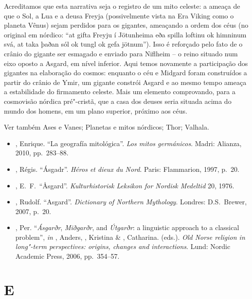 Acreditamos que esta narrativa seja o registro de um mito celeste: a
ameaça de que o Sol, a Lua e a deusa Freyja (possivelmente vista na Era
Viking como o planeta Vênus) sejam perdidos para os gigantes, ameaçando
a ordem dos céus (no original em nórdico: ``at gifta Freyju í Jötunheima
eða spilla loftinu ok himninum svá, at taka þaðan sól ok tungl ok gefa
jötnum''). Isso é reforçado pelo fato de o crânio do gigante ser
esmagado e enviado para Niflheim -- o reino situado num eixo oposto a
Asgard, em nível inferior. Aqui temos novamente a participação dos
gigantes na elaboração do cosmos: enquanto o céu e Midgard foram
construídos a partir do crânio de Ymir, um gigante constrói Asgard e ao
mesmo tempo ameaça a estabilidade do firmamento celeste. Mais um
elemento comprovando, para a cosmovisão nórdica pré"-cristã, que a casa
dos deuses seria situada acima do mundo dos homens, em um plano
superior, próximo aos céus.

Ver também Ases e Vanes; Planetas e mitos nórdicos; Thor; Valhala.



\begin{itemize}\footnotesize
\item
  , Enrique. ``La geografía mitológica''. \emph{Los mitos
  germánicos}. Madri: Alianza, 2010, pp.~283--88.
\item
  , Régis. ``Ásgadr''. \emph{Héros et dieux du Nord}. Paris:
  Flammarion, 1997, p.~20.
\item
  , E.~F.~``Åsgard''. \emph{Kulturhistorisk Leksikon for Nordisk
  Medeltid} 20, 1976.
\item
  , Rudolf. ``Asgard''. \emph{Dictionary of Northern Mythology}.
  Londres: D.S.~Brewer, 2007, p.~20.
\item
  , Per. ``\emph{Ásgarðr}, \emph{Miðgarðr}, and \emph{Útgarðr}: a linguistic approach
  to a classical problem'', \emph{in}  , Anders, , Kristina \&
  , Catharina. (eds.). \emph{Old Norse religion in long"-term
  perspectives: origins, changes and interactions}. Lund: Nordic
  Academic Press, 2006, pp.~354--57.
\end{itemize}

\section{ E }

